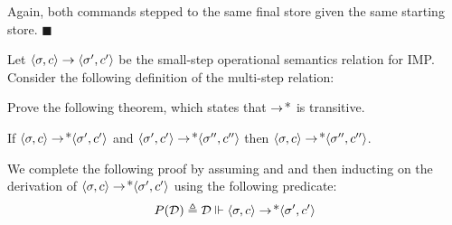 \documentclass[11pt]{article}
\begin{document}
\begin{exercise}
\begin{enumerate}
Again, both commands stepped to the same final store given the same starting store.
$\blacksquare$







\end{enumerate}
\end{exercise}

\begin{exercise}
Let $\CONFIG{\sigma}{c} \stepsone \CONFIG{\sigma'}{c'}$ be the
small-step operational semantics relation for IMP. Consider the
following definition of the multi-step relation:

\begin{mathpar}

\end{mathpar}

\noindent Prove the following theorem, which states that
$\stepsone\kleenestar$ is transitive.

\begin{theorem*} If \( \CONFIG{\sigma}{c} \stepsone\kleenestar
\CONFIG{\sigma'}{c'} \) and \( \CONFIG{\sigma'}{c'}
\stepsone\kleenestar \CONFIG{\sigma''}{c''} \) then \(
\CONFIG{\sigma}{c} \stepsone\kleenestar \CONFIG{\sigma''}{c''} \).
\end{theorem*}


We complete the following proof by assuming \stepsone\kleenestar{} and \stepsone\kleenestar{} and then inducting on the derivation of \( \CONFIG{\sigma}{c} \stepsone\kleenestar
\CONFIG{\sigma'}{c'} \) using the following predicate: \\

$$P(\mathcal{D}) \triangleq \mathcal{D} \Vdash \CONFIG{\sigma}{c} \stepsone\kleenestar \CONFIG{\sigma'}{c'}$$ 


\end{exercise}
\end{document}
